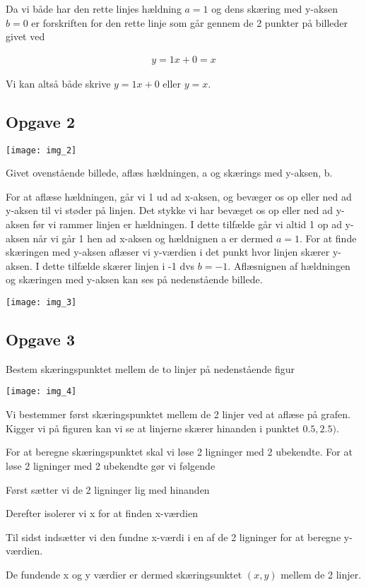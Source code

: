 Da vi både har den rette linjes hældning $a=1$ og dens skæring med y-aksen $b=0$ er forskriften for den rette linje som går gennem de 2 punkter på billeder givet ved

\begin{align*}
y = 1x+0 = x
\end{align*}

Vi kan altså både skrive $y = 1x + 0$ eller $y = x$.

\subsection{Opgave 2}
\texttt{[image: img\_2]}

Givet ovenstående billede, aflæs hældningen, a og skærings med y-aksen, b.

For at aflæse hældningen, går vi 1 ud ad x-aksen, og bevæger os op eller ned ad y-aksen til vi støder på linjen. Det stykke vi har bevæget os op eller ned ad y-aksen før vi rammer linjen er hældningen. I dette tilfælde går vi altid 1 op ad y-aksen når vi går 1 hen ad x-aksen og hældnignen a er dermed $a=1$.
For at finde skæringen med y-aksen aflæser vi y-værdien i det punkt hvor linjen skærer y-aksen. I dette tilfælde skærer linjen i -1 dvs $b=-1$. Aflæsnignen af hældningen og skæringen med y-aksen kan ses på nedenstående billede.

\texttt{[image: img\_3]}

\subsection{Opgave 3}

Bestem skæringspunktet mellem de to linjer på nedenstående figur

\texttt{[image: img\_4]}

Vi bestemmer først skæringspunktet mellem de 2 linjer ved at aflæse på grafen. Kigger vi på figuren kan vi se at linjerne skærer hinanden i punktet $0.5, 2.5)$.

For at beregne skæringspunktet skal vi løse 2 ligninger med 2 ubekendte. For at løse 2 ligninger med 2 ubekendte gør vi følgende

Først sætter vi de 2 ligninger lig med hinanden

Derefter isolerer vi x for at finden x-værdien

Til sidst indsætter vi den fundne x-værdi i en af de 2 ligninger for at beregne y-værdien.

De fundende x og y værdier er dermed skæringsunktet $(x,y)$ mellem de 2 linjer.


